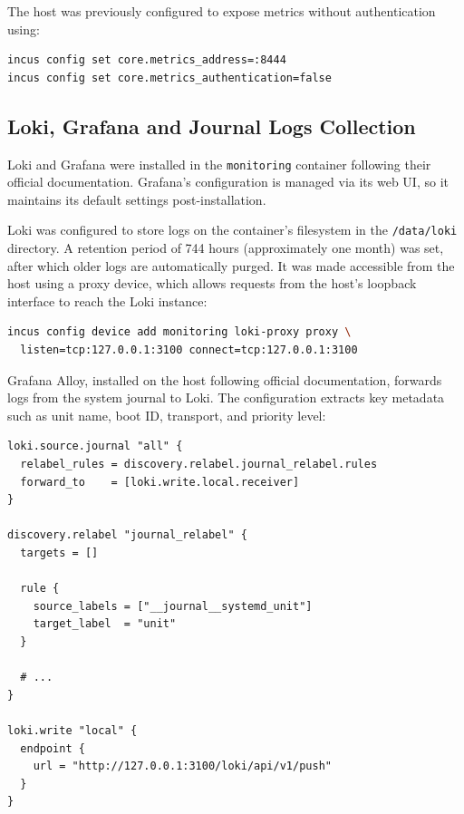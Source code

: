 The host was previously configured to expose metrics without authentication using:

\begin{lstlisting}[language=bash]
incus config set core.metrics_address=:8444
incus config set core.metrics_authentication=false
\end{lstlisting}

\subsection*{Loki, Grafana and Journal Logs Collection}

Loki and Grafana were installed in the \texttt{monitoring} container following their official documentation\cite{grafana-install-debian}. Grafana's configuration is managed via its web UI, so it maintains its default settings post-installation.

Loki was configured to store logs on the container's filesystem in the \texttt{/data/loki} directory. A retention period of 744 hours (approximately one month) was set, after which older logs are automatically purged. It was made accessible from the host using a proxy device, which allows requests from the host's loopback interface to reach the Loki instance:

\begin{lstlisting}[language=bash]
incus config device add monitoring loki-proxy proxy \
  listen=tcp:127.0.0.1:3100 connect=tcp:127.0.0.1:3100
\end{lstlisting}

Grafana Alloy, installed on the host following official documentation\cite{grafana-alloy-install}, forwards logs from the system journal to Loki. The configuration\cite{grafana-alloy-config-example} extracts key metadata such as unit name, boot ID, transport, and priority level:

\begin{lstlisting}[caption={Grafana Alloy configuration forwarding systemd journal logs to Loki}]
loki.source.journal "all" {
  relabel_rules = discovery.relabel.journal_relabel.rules
  forward_to    = [loki.write.local.receiver]
}

discovery.relabel "journal_relabel" {
  targets = []

  rule {
    source_labels = ["__journal__systemd_unit"]
    target_label  = "unit"
  }

  # ...
}

loki.write "local" {
  endpoint {
    url = "http://127.0.0.1:3100/loki/api/v1/push"
  }
}
\end{lstlisting}

